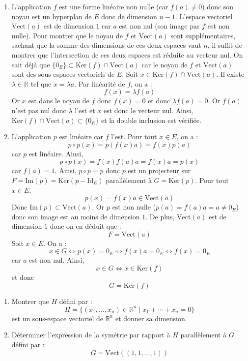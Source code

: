 \documentclass[a4paper,10pt]{report}
\begin{document}
\corr 

\begin{enumerate}
\item L'application $f$ est une forme linéaire non nulle (car $f(a) \neq 0$) donc son noyau est un hyperplan de $E$ donc de dimension $n-1$. L'espace vectoriel $\textrm{Vect}(a)$ est de dimension $1$ car $a$ est non nul (son image par $f$ est non nulle). Pour montrer que le noyau de $f$ et $\textrm{Vect}(a)$ sont supplémentaires, sachant que la somme des dimensions de ces deux espaces vaut $n$, il suffit de montrer que l'intersection de ces deux espaces est réduite au vecteur nul. On sait déjà que $\lbrace 0_E \rbrace \subset \textrm{Ker}(f) \cap \textrm{Vect}(a)$ car le noyau de $f$ et $\textrm{Vect}(a)$ sont des sous-espaces vectoriels de $E$. Soit $x \in \textrm{Ker}(f) \cap \textrm{Vect}(a)$. Il existe $\lambda \in \mathbb{R}$ tel que $x= \lambda a$. Par linéarité de $f$, on a :
$$ f(x) = \lambda f(a)$$
Or $x$ est dans le noyau de $f$ donc $f(x) = 0$ et donc $\lambda f(a) = 0$. Or $f(a)$ n'est pas nul donc $\lambda$ l'est et $x$ est donc le vecteur nul. Ainsi, $\textrm{Ker}(f) \cap \textrm{Vect}(a) \subset \lbrace 0_E \rbrace$ et la double inclusion est vérifiée.
\item L'application $p$ est linéaire car $f$ l'est. Pour tout $x \in E$, on a :
$$ p \circ p (x) = p(f(x) a) = f(x) p(a)$$
car $p$ est linéaire. Ainsi,
$$ p \circ p (x) = f(x) f(a) a = f(x) a = p(x)$$
car $f(a)=1$. Ainsi, $p \circ p=p$ donc $p$ est un projecteur sur $F= \textrm{Im}(p)= \textrm{Ker}(p- \textrm{Id}_E)$ parallèlement à $G = \textrm{Ker}(p)$. Pour tout $x \in E$,
$$ p(x) = f(x) a \in \textrm{Vect}(a)$$
Donc $\textrm{Im}(p) \subset \textrm{Vect}(a)$. Or $p$ est non nulle ($p(a)=f(a) a= a \neq 0_E$) donc son image est au moins de dimension $1$. De plus, $\textrm{Vect}(a)$ est de dimension $1$ donc on en déduit que :
$$ F = \textrm{Vect}(a)$$
Soit $x \in E$. On a :
$$ x \in G \Longleftrightarrow p(x) = 0_E \Longleftrightarrow f(x) a = 0_E \Longleftrightarrow f(x) = 0_E$$
car $a$ est non nul. Ainsi,
$$ x \in G \Longleftrightarrow x \in \textrm{Ker}(f)$$
et donc 
$$ G = \textrm{Ker}(f)$$
\end{enumerate}


\medskip


\begin{Exercice}{} 
\begin{enumerate}
\item Montrer que $H$ défini par :
$$ H = \lbrace (x_1, \ldots, x_n)\in \mathbb{R}^n \; \vert \;    x_1 + \cdots + x_n = 0 \rbrace$$
est un sous-espace vectoriel de $\mathbb{R}^n$ et donner sa dimension.
\item Déterminer l'expression de la symétrie par rapport à $H$ parallèlement à $G$ défini par :
$$ G = \textrm{Vect}((1,1, \ldots, 1))$$
\end{enumerate}
\end{Exercice}
\end{document}

